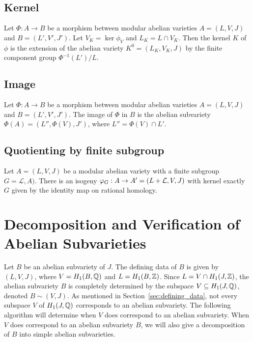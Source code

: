 \subsection{Kernel}%
\label{sub:kernel}

Let $\Phi:A\to B$ be a morphism between modular abelian varieties $A=(L, V, J)$
and $B=(L', V', J')$. Let $V_K=\ker \phi_V$ and $L_K=L\cap V_K$. Then the
kernel $K$ of $\phi$ is the extension of the abelian variety $K^0 = (L_K, V_K,
J)$ by the finite component group $\Phi^{-1}(L')/L$.

\subsection{Image}%
\label{sub:image}

Let $\Phi:A\to B$ be a morphism between modular abelian varieties $A=(L, V, J)$
and $B=(L', V', J')$. The image of $\Phi$ in $B$ is the abelian subvariety
$\Phi(A)=(L'', \Phi(V), J')$, where $L''=\Phi(V)\cap L'$.


\subsection{Quotienting by finite subgroup}%
\label{sub:quotienting_by_finite_subgroup}

Let $A=(L, V, J)$ be a modular abelian variety with a finite subgroup
$G=\mathcal{L}, A)$. There is an isogeny $\varphi_G: A\to A'=(L+\mathcal{L}, V,
J)$ with kernel exactly $G$ given by the identity map on rational homology.



\section{Decomposition and Verification of Abelian Subvarieties}
\label{sec:decomp_verify}

Let $B$ be an abelian subvariety of $J$. The defining data of $B$ is given by
$(L, V, J)$, where $V=H_1(B,\mathbb{Q})$ and $L = H_1(B, \mathbb{Z})$. Since $L = V\cap
H_1(J, \mathbb{Z})$, the abelian subvariety $B$ is completely determined by the
subspace $V\subseteq H_1(J, \mathbb{Q})$, denoted $B\sim (V, J)$. As mentioned in
Section~\ref{sec:defining_data}, not every subspace $V$ of $H_1(J, \mathbb{Q})$
corresponds to an abelian subvariety. The following algorithm will determine
when $V$ does correspond to an abelian subvariety. When $V$ does correspond to
an abelian subvariety $B$, we will also give a decomposition of $B$ into simple
abelian subvarieties.

